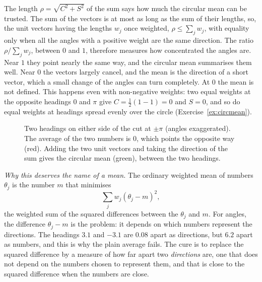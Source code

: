 The length $\rho=\sqrt{C^2+S^2}$ of the sum says how much the circular
mean can be trusted. The sum of the vectors is at most as long as the sum
of their lengths, so, the unit vectors having the lengths $w_j$ once
weighted, $\rho\le\sum_jw_j$, with equality only when all the angles with
a positive weight are the same direction. The ratio
$\rho/\sum_jw_j$, between $0$ and $1$, therefore measures how
concentrated the angles are. Near $1$ they point nearly the same way, and
the circular mean summarises them well. Near $0$ the vectors largely
cancel, and the mean is the direction of a short vector, which a small
change of the angles can turn completely. At $0$ the mean is not
defined. This happens even with non-negative weights: two equal weights
at the opposite headings $0$ and $\pi$ give $C=\tfrac12(1-1)=0$ and
$S=0$, and so do equal weights at headings spread evenly over the circle
(Exercise~\ref{ex:circmean}).

\begin{figure}[ht]
\centering
{}
\caption{Two headings on either side of the cut at $\pm\pi$ (angles
exaggerated). The average of the two numbers is $0$, which points the
opposite way (red). Adding the two unit vectors and taking the direction
of the sum gives the circular mean (green), between the two headings.}
\label{fig:circmean}
\end{figure}

\emph{Why this deserves the name of a mean.} The ordinary weighted mean
of numbers $\theta_j$ is the number $m$ that minimises
\[
  \sum_jw_j(\theta_j-m)^2 ,
\]
the weighted sum of the squared differences between the $\theta_j$ and
$m$. For angles, the difference $\theta_j-m$ is the problem: it depends
on which numbers represent the directions. The headings $3.1$ and $-3.1$
are $0.08$ apart as directions, but $6.2$ apart as numbers, and this is
why the plain average fails. The cure is to replace the squared
difference by a measure of how far apart two \emph{directions} are, one
that does not depend on the numbers chosen to represent them, and that
is close to the squared difference when the numbers are close.

